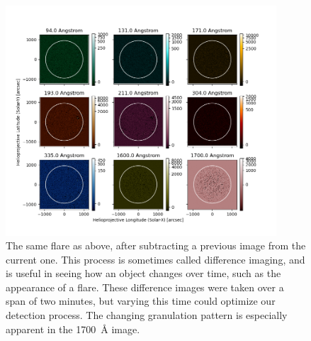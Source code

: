 \documentclass[12pt, letterpaper]{article}
\begin{document}
\begin{figure}[ht]
	\includegraphics[width=0.9\textwidth]{figures/0819_flare_diff.png}
	\centering
	\caption{The same flare as above, after subtracting a previous image from the current one. This process is sometimes called difference imaging, and is useful in seeing how an object changes over time, such as the appearance of a flare. These difference images were taken over a span of two minutes, but varying this time could optimize our detection process. The changing granulation pattern is especially apparent in the 1700~\AA{} image.}
	\label{flare_diff}
\end{figure}
\end{document}
